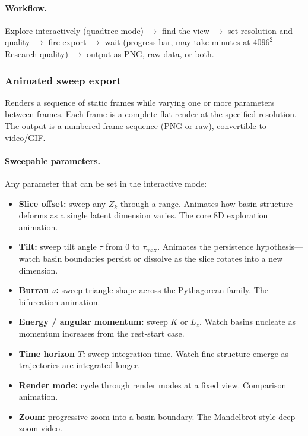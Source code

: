 \documentclass[11pt]{report}
\begin{document}
\paragraph{Workflow.} Explore interactively (quadtree mode) $\to$ find the view $\to$ set resolution and quality $\to$ fire export $\to$ wait (progress bar, may take minutes at $4096^2$ Research quality) $\to$ output as PNG, raw data, or both.


\subsubsection{Animated sweep export}

Renders a sequence of static frames while varying one or more parameters between frames. Each frame is a complete flat render at the specified resolution. The output is a numbered frame sequence (PNG or raw), convertible to video/GIF.

\paragraph{Sweepable parameters.} Any parameter that can be set in the interactive mode:
\begin{itemize}[nosep]
\item \textbf{Slice offset:} sweep any $Z_k$ through a range. Animates how basin structure deforms as a single latent dimension varies. The core 8D exploration animation.
\item \textbf{Tilt:} sweep tilt angle $\tau$ from 0 to $\tau_{\max}$. Animates the persistence hypothesis---watch basin boundaries persist or dissolve as the slice rotates into a new dimension.
\item \textbf{Burrau $\nu$:} sweep triangle shape across the Pythagorean family. The bifurcation animation.
\item \textbf{Energy / angular momentum:} sweep $K$ or $L_z$. Watch basins nucleate as momentum increases from the rest-start case.
\item \textbf{Time horizon $T$:} sweep integration time. Watch fine structure emerge as trajectories are integrated longer.
\item \textbf{Render mode:} cycle through render modes at a fixed view. Comparison animation.
\item \textbf{Zoom:} progressive zoom into a basin boundary. The Mandelbrot-style deep zoom video.
\end{itemize}
\end{document}
